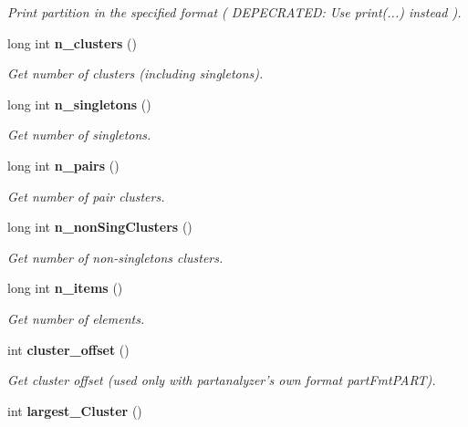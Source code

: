 \begin{CompactItemize}
\begin{CompactList}\small\item\em Print partition in the specified format ( DEPECRATED: Use print(...) instead ). \item\end{CompactList}\item 
long int {\bf n\_\-clusters} ()\label{classPartition_a19}

\begin{CompactList}\small\item\em Get number of clusters (including singletons). \item\end{CompactList}\item 
long int {\bf n\_\-singletons} ()\label{classPartition_a20}

\begin{CompactList}\small\item\em Get number of singletons. \item\end{CompactList}\item 
long int {\bf n\_\-pairs} ()\label{classPartition_a21}

\begin{CompactList}\small\item\em Get number of pair clusters. \item\end{CompactList}\item 
long int {\bf n\_\-non\-Sing\-Clusters} ()\label{classPartition_a22}

\begin{CompactList}\small\item\em Get number of non-singletons clusters. \item\end{CompactList}\item 
long int {\bf n\_\-items} ()\label{classPartition_a23}

\begin{CompactList}\small\item\em Get number of elements. \item\end{CompactList}\item 
int {\bf cluster\_\-offset} ()\label{classPartition_a24}

\begin{CompactList}\small\item\em Get cluster offset (used only with partanalyzer's own format part\-Fmt\-PART). \item\end{CompactList}\item 
int {\bf largest\_\-Cluster} ()\label{classPartition_a25}


\end{CompactItemize}
